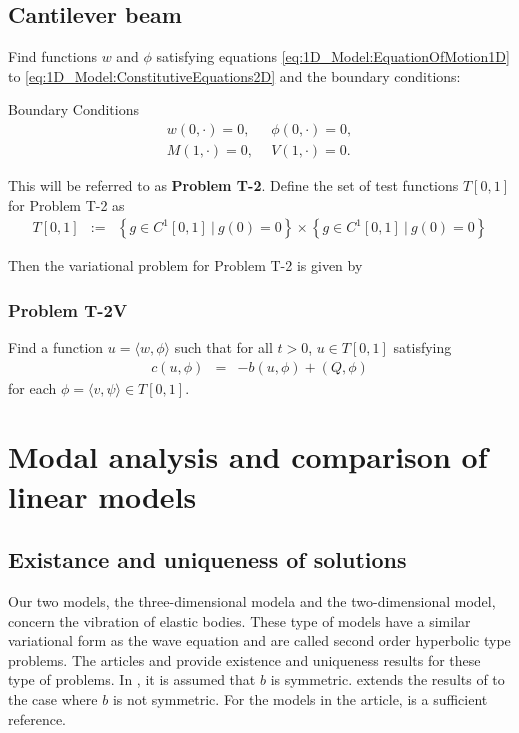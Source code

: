 			\subsection*{Cantilever beam}
				Find functions $w$ and $\phi$ satisfying equations \eqref{eq:1D_Model:EquationOfMotion1D} to \eqref{eq:1D_Model:ConstitutiveEquations2D} and the boundary conditions:

				{Boundary Conditions}
				\begin{eqnarray*}
					w(0,\cdot) = 0, \ \ &\phi(0,\cdot) = 0, \label{eq:1D_Model:ProblemT2BC1}\\
					M(1,\cdot) = 0, \ \ &V(1,\cdot) = 0. \label{eq:1D_Model:ProblemT2BC2}
				\end{eqnarray*}

				This will be referred to as \textbf{Problem T-2}.  Define the set of test functions $T[0,1]$ for Problem T-2 as
				\begin{eqnarray*}
					T[0,1] &:=& \left\{g \in C^1[0,1] \ | \ g(0) = 0 \right\} \times \left\{g \in C^1[0,1] \ | \ g(0) = 0 \right\}
				\end{eqnarray*}

				Then the variational problem for Problem T-2 is given by
				\subsubsection*{Problem T-2V}\label{sssec:1D_Model:ProblemT1V}
					Find a function ${u} = \langle w, \phi \rangle$ such that for all $t >0$, ${u} \in  T[0,1]$ satisfying
					\begin{eqnarray}
						c(u,{\phi}) &=& -b({u},{\phi}) + (Q,{\phi}) \label{var_form_timo}
					\end{eqnarray} for each ${\phi} = \langle v, \psi \rangle \in T[0,1]$. 	
				
\section{Modal analysis and comparison of linear models}\label{sec:ModalAnalysis}	

	\subsection*{Existance and uniqueness of solutions}
		Our two models, the three-dimensional modela and the two-dimensional model, concern the vibration of elastic bodies. These type of models have a similar variational form as the wave equation and are called second order hyperbolic type problems. The articles \cite{VV02} and \cite{VS18} provide existence and uniqueness results for these type of problems. In \cite{VV02}, it is assumed that $b$ is symmetric. \cite{VS18} extends the results of \cite{VV02} to the case where $b$ is not symmetric. For the models in the article, \cite{VV02} is a sufficient reference.

